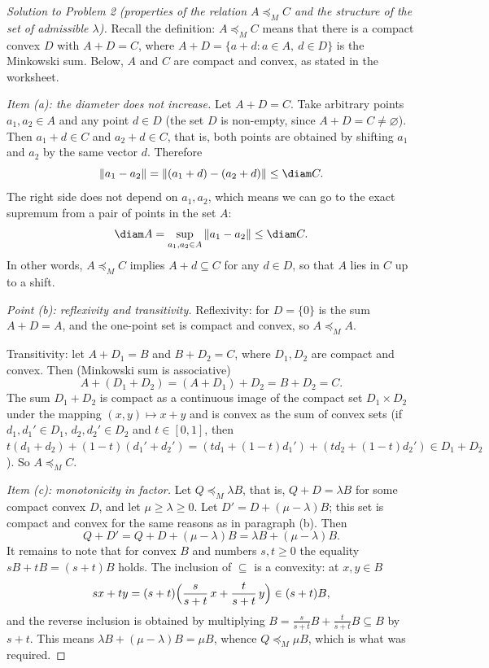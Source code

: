 \documentclass[a4paper,12pt]{report}
\begin{document}
\begin{proof}[Solution to Problem \textup{2} \textup{(}properties of the relation $A\preceq_M C$ and the structure of the set of admissible $\lambda$\textup{)}]

Recall the definition\textup{:} $A\preceq_M C$ means that there is a compact convex $D$ with $A+D=C$, where $A+D=\{a+d: a\in A,\ d\in D\}$ is the Minkowski sum. Below, $A$ and $C$ are compact and convex, as stated in the worksheet.

\textit{Item \textup{(a)}\textup{:} the diameter does not increase.} Let $A+D=C$. Take arbitrary points $a_1,a_2\in A$ and any point $d\in D$ \textup{(}the set $D$ is non-empty, since $A+D=C\ne\varnothing$\textup{)}. Then $a_1+d\in C$ and $a_2+d\in C$, that is, both points are obtained by shifting $a_1$ and $a_2$ by the same vector $d$. Therefore
\[
\|a_1-a_2\|=\|(a_1+d)-(a_2+d)\|\le\diam C .
\]
The right side does not depend on $a_1,a_2$, which means we can go to the exact supremum from a pair of points in the set $A$\textup{:}
\[
\diam A=\sup_{a_1,a_2\in A}\|a_1-a_2\|\le\diam C .
\]
In other words, $A\preceq_M C$ implies $A+d\subseteq C$ for any $d\in D$, so that $A$ lies in $C$ up to a shift.

\textit{Point \textup{(b)}\textup{:} reflexivity and transitivity.} Reflexivity\textup{:} for $D=\{0\}$ is the sum $A+D=A$, and the one-point set is compact and convex, so $A\preceq_M A$.

Transitivity\textup{:} let $A+D_1=B$ and $B+D_2=C$, where $D_1,D_2$ are compact and convex. Then \textup{(}Minkowski sum is associative\textup{)}
\[
A+(D_1+D_2)=(A+D_1)+D_2=B+D_2=C .
\]
The sum $D_1+D_2$ is compact as a continuous image of the compact set $D_1\times D_2$ under the mapping $(x,y)\mapsto x+y$ and is convex as the sum of convex sets \textup{(}if $d_1,d_1'\in D_1$, $d_2,d_2'\in D_2$ and $t\in[0,1]$, then $t(d_1+d_2)+(1-t)(d_1'+d_2')=(td_1+(1-t)d_1')+(td_2+(1-t)d_2')\in D_1+D_2$\textup{)}. So $A\preceq_M C$.

\textit{Item \textup{(c)}\textup{:} monotonicity in factor.} Let $Q\preceq_M\lambda B$, that is, $Q+D=\lambda B$ for some compact convex $D$, and let $\mu\ge\lambda\ge0$. Let $D'=D+(\mu-\lambda)B$; this set is compact and convex for the same reasons as in paragraph \textup{(b)}. Then
\[
Q+D'=Q+D+(\mu-\lambda)B=\lambda B+(\mu-\lambda)B .
\]
It remains to note that for convex $B$ and numbers $s,t\ge0$ the equality $sB+tB=(s+t)B$ holds. The inclusion of $\subseteq$ is a convexity\textup{:} at $x,y\in B$
\[
sx+ty=(s+t)\Bigl(\frac{s}{s+t}\,x+\frac{t}{s+t}\,y\Bigr)\in(s+t)B ,
\]
and the reverse inclusion is obtained by multiplying $B=\frac{s}{s+t}B+\frac{t}{s+t}B\subseteq B$ by $s+t$. This means $\lambda B+(\mu-\lambda)B=\mu B$, whence $Q\preceq_M\mu B$, which is what was required.


\end{proof}
\end{document}
